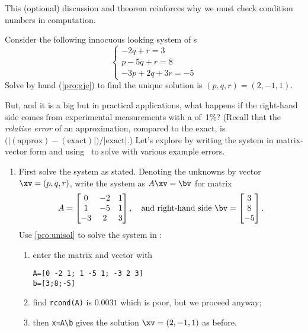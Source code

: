 This (optional) discussion and theorem reinforces why we must check condition numbers in computation.


\begin{example} \label{eg:ilsle}
Consider the following innocuous looking system of s
\begin{equation*}
\begin{cases}
-2q+r=3
\\p-5q+r=8
\\-3p+2q+3r=-5
\end{cases}
\end{equation*}
Solve by hand (\cref{pro:gje}) to find the unique solution is \((p,q,r)=(2,-1,1)\).

But, and it is a big but in practical applications, what happens if the right-hand side comes from experimental measurements with a  of~1\%? 
(Recall that the \emph{relative error} of an approximation, compared to the exact, is \(\big(|(\text{approx})-(\text{exact})|\big)/{|\text{exact}|}\).)
Let's explore by writing the system in matrix-vector form and using \script\ to solve with various example errors.
\begin{enumerate}
\item First solve the system as stated.  
Denoting the unknowns by vector \(\xv=(p,q,r)\), write the system as \(A\xv=\bv\) for matrix
\begin{equation*}
A=\begin{bmatrix} 0&-2&1
\\1&-5&1
\\-3&2&3 \end{bmatrix},
\quad\text{and right-hand side }
\bv=\begin{bmatrix} 3\\8\\-5 \end{bmatrix}.
\end{equation*}
Use \cref{pro:unisol} to solve the system in \script:
\begin{enumerate}
\item enter the matrix and vector with
\setbox\ajrqrbox\hbox{}%
\marginajrbox%
\begin{verbatim}
A=[0 -2 1; 1 -5 1; -3 2 3]
b=[3;8;-5]
\end{verbatim}
\item find \verb|rcond(A)| is \(0.0031\) which is poor, but we proceed anyway;
\item then \verb|x=A\b| gives the solution \(\xv=(2,-1,1)\) as before.
\end{enumerate}


\end{enumerate}
\end{example}
